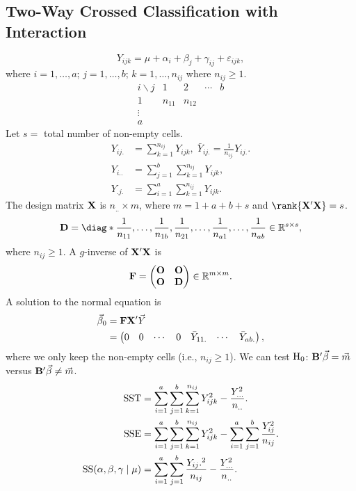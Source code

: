\subsection*{Two-Way Crossed Classification with Interaction}
\[ Y_{ijk}=\mu+\alpha_i+\beta_j+\gamma_{ij}+\varepsilon_{ijk}, \]
where $ i=1,\ldots,a $; $ j=1,\ldots,b $;
$ k=1,\ldots,n_{ij} $ where $ n_{ij}\ge 1 $.
\[ \begin{array}{ccccc}
        i\backslash j & 1      & 2      & \cdots & b \\
        1             & n_{11} & n_{12}              \\
        \vdots                                       \\
        a
    \end{array} \]
Let $ s= $ total number of non-empty cells.
\begin{align*}
    Y_{ij.} & =\sum_{k=1}^{n_{ij}}Y_{ijk},\; \bar{Y}_{ij.}=\frac{1}{n_{ij.}}Y_{ij.}. \\
    Y_{i..} & =\sum_{j=1}^{b}\sum_{k=1}^{n_{ij}}Y_{ijk},                             \\
    Y_{.j.} & =\sum_{i=1}^{a}\sum_{k=1}^{n_{ij}}Y_{ijk}.
\end{align*}
The design matrix $ \mathbf{X} $ is $ n_{..}\times m $,
where $ m=1+a+b+s $ and $ \rank{\Matrix{X}'\Matrix{X}}=s $.
\[ \Matrix{D}=\diag*{\frac{1}{n_{11}},\ldots,\frac{1}{n_{1b}},\frac{1}{n_{21}},\ldots,\frac{1}{n_{a1}},\ldots,\frac{1}{n_{ab}}}\in\R^{s\times s}, \]
where $ n_{ij}\ge 1 $. A $ g $-inverse of $ \mathbf{X}'\mathbf{X} $ is
\[ \mathbf{F}=\begin{pmatrix}
        \mathbf{O} & \mathbf{O} \\
        \mathbf{O} & \mathbf{D}
    \end{pmatrix}\in\mathbb{R}^{m\times m}. \]
A solution to the normal equation is
\begin{align*}
    \vec{\beta}_0
     & =\mathbf{F}\mathbf{X}'\vec{Y}                             \\
     & =\begin{pmatrix}
            0 & 0 & \cdots & 0 & \bar{Y}_{11.} & \cdots & \bar{Y}_{ab.}
        \end{pmatrix},
\end{align*}
where we only keep the non-empty cells (i.e., $ n_{ij}\ge 1 $).
We can test $ \text{H}_0 $: $ \mathbf{B}'\vec{\beta}=\vec{m} $
versus $ \mathbf{B}'\vec{\beta}\ne \vec{m} $.
\begin{align*}
    \text{SST}                                   & =\sum_{i=1}^{a}\sum_{j=1}^{b}\sum_{k=1}^{n_{ij}}Y_{ijk}^2-\frac{Y_{...}^2}{n_{..}}.                            \\
    \text{SSE}                                   & =\sum_{i=1}^{a}\sum_{j=1}^{b}\sum_{k=1}^{n_{ij}}Y_{ijk}^2-\sum_{i=1}^{a}\sum_{j=1}^{b}\frac{Y_{ij}^2}{n_{ij}}. \\
    \text{SS}(\alpha,\beta,\gamma\mid \mu) & =\sum_{i=1}^{a}\sum_{j=1}^{b}\frac{Y_{ij}.^2}{n_{ij}}-\frac{Y_{...}^2}{n_{..}}.
\end{align*}
